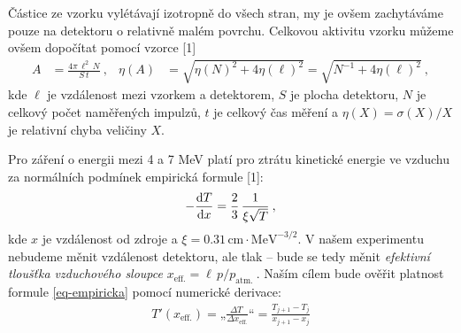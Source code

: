 \documentclass[10pt,a4paper]{article}
\renewcommand{\U}[1]{\ensuremath{\,\mathrm{#1}}}
\newcommand{\°}{\degree}
\begin{document}
\bigskip

Částice ze vzorku vylétávají izotropně do všech stran, my je ovšem zachytáváme pouze na detektoru o relativně malém povrchu. Celkovou aktivitu vzorku můžeme ovšem dopočítat pomocí vzorce [1]
\begin{align}
    A &= \frac{4\pi \, \ell^2 \, N}{S \, t} \: ,
    &
    \eta(A) &= \sqrt{ \eta(N)^2 + 4\eta(\ell)^2 }
    = \sqrt{ N^{-1} + 4\eta(\ell)^2 } \: ,
    \label{eq-aktivita}
\end{align}
kde $\ell$ je vzdálenost mezi vzorkem a detektorem, $S$ je plocha detektoru, $N$ je celkový počet naměřených impulzů, $t$ je celkový čas měření a $\eta(X) = \sigma(X) / X$ je relativní chyba veličiny $X$.

\bigskip

Pro záření o energii mezi 4 a 7 MeV platí pro ztrátu kinetické energie ve vzduchu za normálních podmínek empirická formule [1]:
\begin{equation}
    -\frac{\text d T}{\text d x} = \frac{2}{3} \, \frac{1}{\xi \sqrt T} \: ,
    \label{eq-empiricka}
\end{equation}
kde $x$ je vzdálenost od zdroje a $\xi = 0.31 \U{cm \cdot MeV^{-3/2}}$. V našem experimentu nebudeme měnit vzdálenost detektoru, ale tlak – bude se tedy měnit \textit{efektivní tloušťka vzduchového sloupce} $x_{\text{eff.}} = \ell \, p / p_{\text{atm.}} \:$. Naším cílem bude ověřit platnost formule \eqref{eq-empiricka} pomocí numerické derivace:
\begin{align}
    T'(x_{\text{eff.}})
    = „\frac{\Delta T\;}{\Delta x_{\text{eff.}}\!\!}“
    = \frac{T_{j+1} - T_j}{x_{j+1} - x_j}
    \label{eq-deriv}
\end{align}

\bigskip
\end{document}
